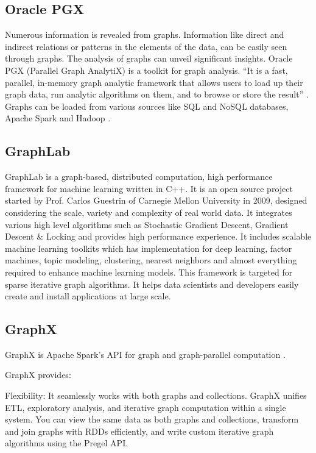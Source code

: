 \subsection{Oracle PGX}

    Numerous information is revealed from graphs. Information like
    direct and indirect relations or patterns in the elements of the
    data, can be easily seen through graphs. The analysis of graphs
    can unveil significant insights. Oracle PGX (Parallel Graph
    AnalytiX) is a toolkit for graph analysis.  ``It is a fast,
    parallel, in-memory graph analytic framework that allows users to
    load up their graph data, run analytic algorithms on them, and to
    browse or store the result'' \cite{www-pgx}. Graphs can be loaded
    from various sources like SQL and NoSQL databases, Apache Spark
    and Hadoop \cite{www-ora}.
    
\subsection{GraphLab}

    GraphLab \cite{www-graphlab} is a graph-based, distributed
    computation, high performance framework for machine learning
    written in C++. It is an open source project started by
    Prof. Carlos Guestrin of Carnegie Mellon University in 2009,
    designed considering the scale, variety and complexity of real
    world data. It integrates various high level algorithms such as
    Stochastic Gradient Descent, Gradient Descent \& Locking and
    provides high performance experience. It includes scalable machine
    learning toolkits which has implementation for deep learning,
    factor machines, topic modeling, clustering, nearest neighbors and
    almost everything required to enhance machine learning
    models. This framework is targeted for sparse iterative graph
    algorithms. It helps data scientists and developers easily create
    and install applications at large scale.
    
\subsection{GraphX}

    GraphX is Apache Spark's API for graph and graph-parallel
    computation \cite{www-graphX}.
	  
    GraphX provides:
    
    Flexibility: It seamlessly works with both graphs and
    collections. GraphX unifies ETL, exploratory analysis, and
    iterative graph computation within a single system. You can view
    the same data as both graphs and collections, transform and join
    graphs with RDDs efficiently, and write custom iterative graph
    algorithms using the Pregel API.
    
